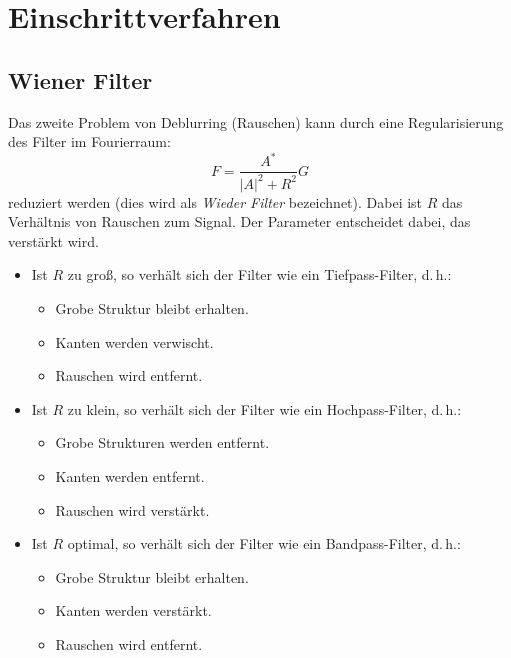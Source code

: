 \documentclass[a4paper, 11pt, accentcolor = tud3b]{tudreport}
\begin{document}
		\section{Einschrittverfahren}
			\subsection{Wiener Filter}
				Das zweite Problem von Deblurring (Rauschen) kann durch eine Regularisierung des Filter im Fourierraum:
				\begin{equation*}
					F = \frac{A^\ast}{\lvert A \rvert^2 + R^2} G
				\end{equation*}
				reduziert werden (dies wird als \emph{Wieder Filter} bezeichnet). Dabei ist \(R\) das Verhältnis von Rauschen zum Signal. Der Parameter entscheidet dabei, das verstärkt wird.
				\begin{itemize}
					\item Ist \(R\) zu groß, so verhält sich der Filter wie ein Tiefpass-Filter, d.\,h.:
						\begin{itemize}
							\item Grobe Struktur bleibt erhalten.
							\item Kanten werden verwischt.
							\item Rauschen wird entfernt.
						\end{itemize}
					\item Ist \(R\) zu klein, so verhält sich der Filter wie ein Hochpass-Filter, d.\,h.:
						\begin{itemize}
							\item Grobe Strukturen werden entfernt.
							\item Kanten werden entfernt.
							\item Rauschen wird verstärkt.
						\end{itemize}
					\item Ist \(R\) optimal, so verhält sich der Filter wie ein Bandpass-Filter, d.\,h.:
						\begin{itemize}
							\item Grobe Struktur bleibt erhalten.
							\item Kanten werden verstärkt.
							\item Rauschen wird entfernt.
						\end{itemize}
				\end{itemize}
			
\end{document}
